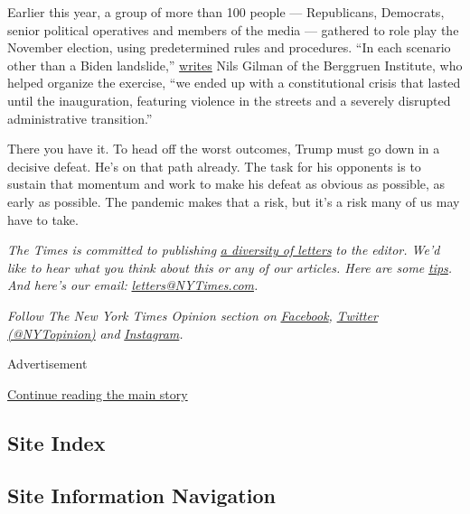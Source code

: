 Earlier this year, a group of more than 100 people --- Republicans,
Democrats, senior political operatives and members of the media ---
gathered to role play the November election, using predetermined rules
and procedures. ``In each scenario other than a Biden landslide,''
\href{https://www.the-american-interest.com/2020/08/06/getting-from-november-to-january/}{writes}
Nils Gilman of the Berggruen Institute, who helped organize the
exercise, ``we ended up with a constitutional crisis that lasted until
the inauguration, featuring violence in the streets and a severely
disrupted administrative transition.''

There you have it. To head off the worst outcomes, Trump must go down in
a decisive defeat. He's on that path already. The task for his opponents
is to sustain that momentum and work to make his defeat as obvious as
possible, as early as possible. The pandemic makes that a risk, but it's
a risk many of us may have to take.

\emph{The Times is committed to publishing}
\href{https://www.nytimes3xbfgragh.onion/2019/01/31/opinion/letters/letters-to-editor-new-york-times-women.html}{\emph{a
diversity of letters}} \emph{to the editor. We'd like to hear what you
think about this or any of our articles. Here are some}
\href{https://help.nytimes3xbfgragh.onion/hc/en-us/articles/115014925288-How-to-submit-a-letter-to-the-editor}{\emph{tips}}\emph{.
And here's our email:}
\href{mailto:letters@NYTimes.com}{\emph{letters@NYTimes.com}}\emph{.}

\emph{Follow The New York Times Opinion section on}
\href{https://www.facebookcorewwwi.onion/nytopinion}{\emph{Facebook}}\emph{,}
\href{http://twitter.com/NYTOpinion}{\emph{Twitter (@NYTopinion)}}
\emph{and}
\href{https://www.instagram.com/nytopinion/}{\emph{Instagram}}\emph{.}

Advertisement

\protect\hyperlink{after-bottom}{Continue reading the main story}

\hypertarget{site-index}{%
\subsection{Site Index}\label{site-index}}

\hypertarget{site-information-navigation}{%
\subsection{Site Information
Navigation}\label{site-information-navigation}}

